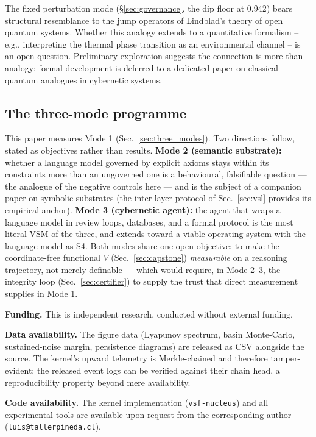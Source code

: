 \documentclass[11pt, a4paper]{article}
\newcommand{\nucleus}{\texttt{vsf-nucleus}}
\begin{document}
The fixed perturbation mode (§\ref{sec:governance}, the dip floor at 0.942)
bears structural resemblance to the jump operators of Lindblad's theory
of open quantum systems.
Whether this analogy extends to a quantitative formalism -- e.g.,
interpreting the thermal phase transition as an environmental channel --
is an open question.
Preliminary exploration suggests the connection is more than analogy;
formal development is deferred to a dedicated paper on classical-quantum
analogues in cybernetic systems.

\subsection*{The three-mode programme}

This paper measures Mode 1 (Sec.~\ref{sec:three_modes}). Two directions follow,
stated as objectives rather than results. \textbf{Mode 2 (semantic substrate):}
whether a language model governed by explicit axioms stays within its
constraints more than an ungoverned one is a behavioural, falsifiable question ---
the analogue of the negative controls here --- and is the subject of a companion
paper on symbolic substrates (the inter-layer protocol of Sec.~\ref{sec:vsl}
provides its empirical anchor). \textbf{Mode 3 (cybernetic agent):} the agent
that wraps a language model in review loops, databases, and a formal protocol is
the most literal VSM of the three, and extends toward a viable operating system
with the language model as S4. Both modes share one open objective: to make the
coordinate-free functional $V$ (Sec.~\ref{sec:capstone}) \emph{measurable} on a
reasoning trajectory, not merely definable --- which would require, in Mode 2--3,
the integrity loop (Sec.~\ref{sec:certifier}) to supply the trust that direct
measurement supplies in Mode 1.

\bigskip
\noindent\textbf{Funding.}
This is independent research, conducted without external funding.

\smallskip
\noindent\textbf{Data availability.}
The figure data (Lyapunov spectrum, basin Monte-Carlo, sustained-noise margin,
persistence diagrams) are released as CSV alongside the source. The kernel's
upward telemetry is Merkle-chained and therefore tamper-evident: the released
event logs can be verified against their chain head, a reproducibility property
beyond mere availability.

\smallskip
\noindent\textbf{Code availability.}
The kernel implementation (\nucleus{}) and all experimental tools are
available upon request from the corresponding author (\texttt{luis@tallerpineda.cl}).
\end{document}
